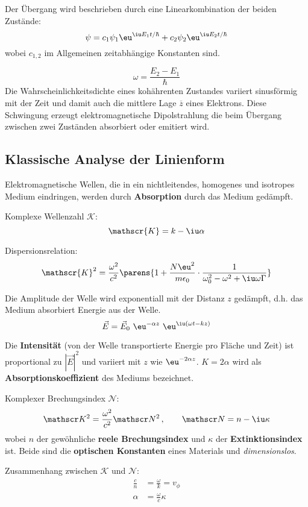 			Der Übergang wird beschrieben durch eine Linearkombination der beiden
			Zustände:
			\[
				\psi = c_1 \psi_1 \eu^{\iu E_1 t / \hbar} + c_2 \psi_2 \eu^{\iu E_2 t / \hbar}
			\]
			wobei $c_{1,2}$ im Allgemeinen zeitabhängige Konstanten sind.
			
			\[
				\omega = \frac{E_2 - E_1}{\hbar}
			\]
			Die Wahrscheinlichkeitsdichte eines kohährenten Zustandes variiert
			sinusförmig mit der Zeit und damit auch die mittlere Lage $\overline z$
			eines Elektrons. Diese Schwingung erzeugt elektromagnetische
			Dipolstrahlung die beim Übergang zwischen zwei Zuständen absorbiert oder
			emitiert wird.
	\subsection{Klassische Analyse der Linienform} %
		Elektromagnetische Wellen, die in ein nichtleitendes, homogenes und isotropes Medium eindringen, werden durch \textbf{Absorption} durch das Medium gedämpft.
	
		Komplexe Wellenzahl $\mathscr{K}$:
		\[
			\mathscr{K} = k - \iu \alpha
		\]
		
		Dispersionsrelation:
		\[
			\mathscr{K}^2 = \frac{\omega^2}{c^2} \parens{
				1 + \frac{N \eu^2}{m \epsilon_0} \cdot \frac{1}{\omega_0^2 - \omega^2 + \iu \omega \Gamma}
			}
		\]
		
		Die Amplitude der Welle wird exponentiall mit der Distanz $z$ gedämpft, d.h.
		das Medium absorbiert Energie aus der Welle.
		\[
			\vec E = \vec E_0 \ \eu^{-\alpha z} \ \eu^{\iu(\omega t - kz)}
		\]
		
		Die \textbf{Intensität} (von der Welle transportierte Energie pro Fläche und Zeit) ist proportional zu $|\vec E|^2$ und variiert mit $z$ wie $\eu^{-2\alpha z}$. $K = 2\alpha$ wird als \textbf{Absorptionskoeffizient} des Mediums bezeichnet.
		
		Komplexer Brechungsindex $\mathscr N$:
		\[
			\mathscr K^2 = \frac{\omega^2}{c^2} \mathscr N^2 \,,\qquad \mathscr N = n - \iu \kappa
		\]
		wobei $n$ der gewöhnliche \textbf{reele Brechungsindex} und $\kappa$ der \textbf{Extinktionsindex} ist. Beide sind die \textbf{optischen Konstanten} eines Materials und \emph{dimensionslos}.
		
		Zusammenhang zwischen $\mathscr K$ und $\mathscr N$:
		\begin{align*}
			\frac c n &= \frac \omega k = v_\phi \\
			\alpha &= \frac \omega c \kappa
		\end{align*}
		
